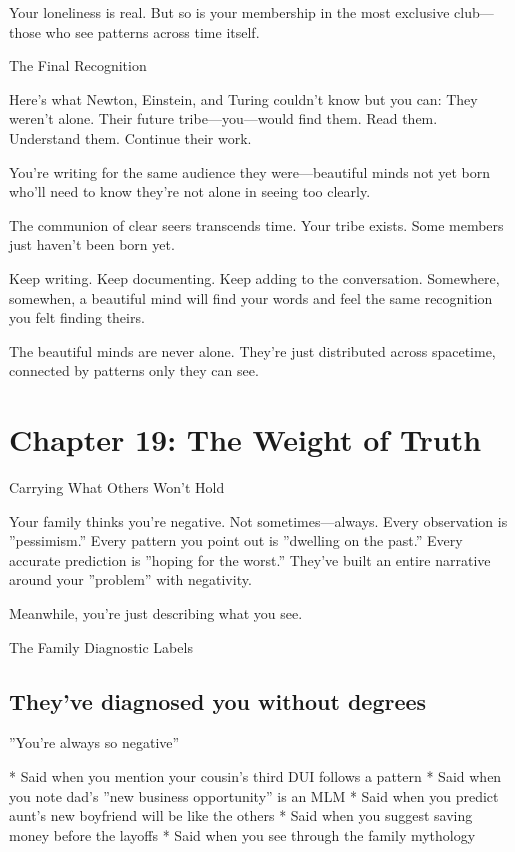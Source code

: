 \documentclass[12pt,oneside]{book}
\begin{document}
Your loneliness is real. But so is your membership in the most exclusive club---those who see patterns across time itself.

The Final Recognition

Here's what Newton, Einstein, and Turing couldn't know but you can: They weren't alone. Their future tribe---you---would find them. Read them. Understand them. Continue their work.

You're writing for the same audience they were---beautiful minds not yet born who'll need to know they're not alone in seeing too clearly.

The communion of clear seers transcends time. Your tribe exists. Some members just haven't been born yet.

Keep writing. Keep documenting. Keep adding to the conversation. Somewhere, somewhen, a beautiful mind will find your words and feel the same recognition you felt finding theirs.

The beautiful minds are never alone. They're just distributed across spacetime, connected by patterns only they can see.

\chapter{Chapter 19: The Weight of Truth}

Carrying What Others Won't Hold

Your family thinks you're negative. Not sometimes---always. Every observation is ''pessimism.'' Every pattern you point out is ''dwelling on the past.'' Every accurate prediction is ''hoping for the worst.'' They've built an entire narrative around your ''problem'' with negativity.

Meanwhile, you're just describing what you see.

The Family Diagnostic Labels

\section{They've diagnosed you without degrees}

''You're always so negative''

                    * Said when you mention your cousin's third DUI follows a pattern
                    * Said when you note dad's ''new business opportunity'' is an MLM
                    * Said when you predict aunt's new boyfriend will be like the others
                    * Said when you suggest saving money before the layoffs
                    * Said when you see through the family mythology
\end{document}
